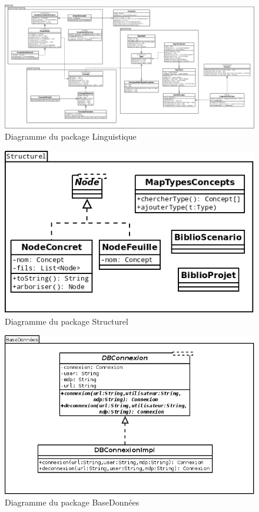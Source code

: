 \documentclass[12pt]{report}
\begin{document}
\begin{figure}[h!]
\begin{center}
\includegraphics[scale=0.5]{DiagLinguistique.png}
\caption{Diagramme du package Linguistique}
\end{center}
\end{figure}


\begin{figure}[h!]
\begin{center}
\includegraphics[scale=0.5]{DiagStructurel.png}
\caption{Diagramme du package Structurel}
\end{center}
\end{figure}

\begin{figure}[h!]
\begin{center}
\includegraphics[scale=0.5]{DiagBD.png}
\caption{Diagramme du package BaseDonnées}
\end{center}
\end{figure}
\end{document}
